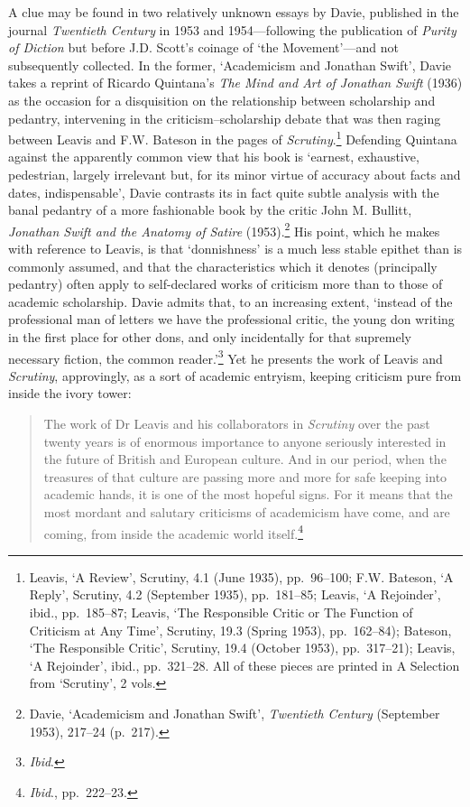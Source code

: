 \documentclass[]{article}
\begin{document}
A clue may be found in two relatively unknown essays by Davie, published
in the journal \emph{Twentieth Century} in 1953 and 1954—following the
publication of \emph{Purity of Diction} but before J.D. Scott’s coinage
of ‘the Movement’—and not subsequently collected. In the former,
‘Academicism and Jonathan Swift’, Davie takes a reprint of Ricardo
Quintana’s \emph{The Mind and Art of Jonathan Swift} (1936) as the
occasion for a disquisition on the relationship between scholarship and
pedantry, intervening in the criticism–scholarship debate that was then
raging between Leavis and F.W. Bateson in the pages of
\emph{Scrutiny}.\footnote{Leavis, ‘A Review’, Scrutiny, 4.1 (June 1935),
  pp.~96–100; F.W. Bateson, ‘A Reply’, Scrutiny, 4.2 (September 1935),
  pp.~181–85; Leavis, ‘A Rejoinder’, ibid., pp.~185–87; Leavis, ‘The
  Responsible Critic or The Function of Criticism at Any Time’,
  Scrutiny, 19.3 (Spring 1953), pp.~162–84); Bateson, ‘The Responsible
  Critic’, Scrutiny, 19.4 (October 1953), pp.~317–21); Leavis, ‘A
  Rejoinder’, ibid., pp.~321–28. All of these pieces are printed in A
  Selection from ‘Scrutiny’, 2 vols.} Defending Quintana against the
apparently common view that his book is ‘earnest, exhaustive,
pedestrian, largely irrelevant but, for its minor virtue of accuracy
about facts and dates, indispensable’, Davie contrasts its in fact quite
subtle analysis with the banal pedantry of a more fashionable book by
the critic John M. Bullitt, \emph{Jonathan Swift and the Anatomy of
Satire} (1953).\footnote{Davie, ‘Academicism and Jonathan Swift’,
  \emph{Twentieth Century} (September 1953), 217–24 (p.~217).} His
point, which he makes with reference to Leavis, is that ‘donnishness’ is
a much less stable epithet than is commonly assumed, and that the
characteristics which it denotes (principally pedantry) often apply to
self-declared works of criticism more than to those of academic
scholarship. Davie admits that, to an increasing extent, ‘instead of the
professional man of letters we have the professional critic, the young
don writing in the first place for other dons, and only incidentally for
that supremely necessary fiction, the common reader.’\footnote{\emph{Ibid}.}
Yet he presents the work of Leavis and \emph{Scrutiny}, approvingly, as
a sort of academic entryism, keeping criticism pure from inside the
ivory tower:

\begin{quote}
\singlespacing The work of Dr Leavis and his collaborators in
\emph{Scrutiny} over the past twenty years is of enormous importance to
anyone seriously interested in the future of British and European
culture. And in our period, when the treasures of that culture are
passing more and more for safe keeping into academic hands, it is one of
the most hopeful signs. For it means that the most mordant and salutary
criticisms of academicism have come, and are coming, from inside the
academic world itself.\footnote{\emph{Ibid}., pp.~222–23.}
\end{quote}
\end{document}
